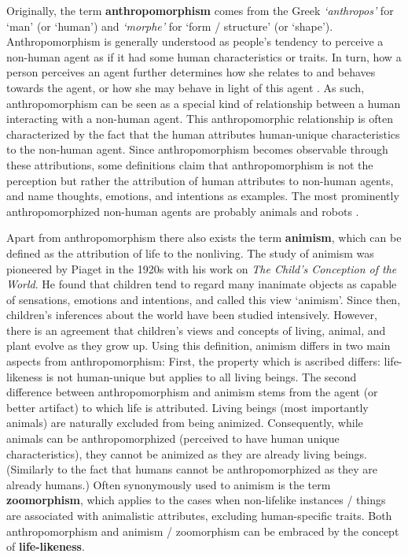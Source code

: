 \documentclass{frontiersSCNS} %
\begin{document}
Originally, the term \textbf{anthropomorphism} comes from the Greek \textit{`anthropos'} for `man' (or `human') and \textit{`morphe'} for `form / structure' (or `shape'). Anthropomorphism is generally understood as people's tendency to perceive a non-human agent as if it had some human characteristics or traits. In turn, how a person perceives an agent further determines how she relates to and behaves towards the agent, or how she may behave in light of this agent \citep{epley_when_2008}.
As such, anthropomorphism can be seen as a special kind of relationship between a human interacting with a non-human agent. This anthropomorphic relationship is often characterized by the fact that the human attributes human-unique characteristics to the non-human agent. Since anthropomorphism becomes observable through these attributions, some definitions claim that anthropomorphism is not the perception but rather the attribution of human attributes to non-human agents, and name thoughts, emotions, and intentions as examples. The most prominently anthropomorphized non-human agents are probably animals and robots \citep{duffy_anthropomorphism_2003,schmitz_concepts_2011}.

Apart from anthropomorphism there also exists the term \textbf{animism}, which can be defined as the attribution of life to the nonliving. The study of animism was pioneered by Piaget in the 1920s with his work on \textit{The Child's Conception of the  World}. He found that children tend to regard many inanimate objects as capable of sensations, emotions and intentions, and called this view `animism'. Since then, children's inferences about the world have been studied intensively. However, there is an agreement that children's views and concepts of living, animal, and plant evolve as they grow up. Using this definition, animism differs in two main aspects from anthropomorphism:
First, the property which is ascribed differs: life-likeness is not human-unique but applies to all living beings. The second difference between anthropomorphism and animism stems from the agent (or better artifact) to which life is attributed. Living beings (most importantly animals) are naturally excluded from being animized. Consequently, while animals can be anthropomorphized (perceived to have human unique characteristics), they cannot be animized as they are already living beings. (Similarly to the fact that humans cannot be anthropomorphized as they are already humans.)
Often synonymously used to animism is the term \textbf{zoomorphism}, which applies to the cases when non-lifelike instances / things are associated with animalistic attributes, excluding human-specific traits. Both anthropomorphism and animism / zoomorphism can be embraced by the concept of \textbf{life-likeness}.
\end{document}
